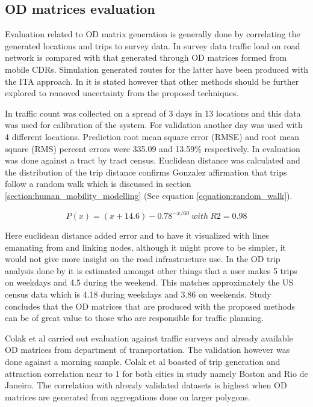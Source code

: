 \documentclass[12pt, a4paper]{report}
\theoremstyle{definition}
\theoremstyle{definition}%
\theoremstyle{definition}%
\theoremstyle{definition}%
\theoremstyle{definition}%
\theoremstyle{definition}%
\begin{document}
\subsection{OD matrices evaluation}

Evaluation related to OD matrix generation is generally done by correlating the generated locations and trips to survey data. In \cite{Toole2015} survey data traffic load on road network is compared with that generated through OD matrices formed from mobile CDRs. Simulation generated routes for the latter have been produced with the ITA approach. In \cite{Toole2015} it is stated however that other methods should be further explored to removed uncertainty from the proposed techniques.

In \cite{Iqbal2014} traffic count was collected on a spread of 3 days in 13 locations and this data was used for calibration of the system.  For validation another day was used with 4 different locations. Prediction root mean square error (RMSE) and root mean square (RMS) percent errors were 335.09 and 13.59\% respectively. In \cite{Calabrese2011} evaluation was done against a tract by tract census. Euclidean distance was calculated and the distribution of the trip distance confirms Gonzalez affirmation that trips follow a random walk \cite{Gonzalez2008} which is discussed in section \ref{section:human_mobility_modelling}  (See equation \ref{equation:random_walk}).

\begin{equation}\label{equation:random_walk}
P(x) = (x+14.6)-0.78^{-x/60}~ with~ R2 = 0.98 
\end{equation}

Here euclidean distance added error and to have it visualized with lines emanating from and linking nodes, although it might prove to be simpler, it would not give more insight on the road infrastructure use. In the OD trip analysis done by \cite{Calabrese2011} it is estimated amongst other things that a user makes 5 trips on weekdays and 4.5 during the weekend. This matches approximately the US census data which is 4.18 during weekdays and 3.86 on weekends. Study concludes that the OD matrices that are produced with the proposed methods can be of great value to those who are responsible for traffic planning.

Colak et al carried out evaluation against traffic surveys and already available OD matrices from department of transportation.  The validation however was done against a morning sample. Colak et al boasted of trip generation and attraction correlation near to 1 for both cities in study namely Boston and Rio de Janeiro. The correlation with already validated datasets is highest when OD matrices are generated from aggregations done on larger polygons. 
\end{document}
